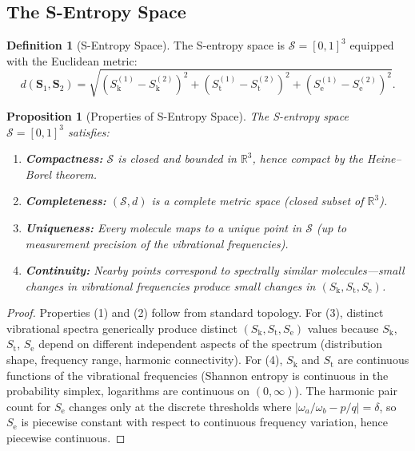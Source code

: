 \documentclass[11pt,a4paper]{article}
\newtheorem{proposition}[theorem]{Proposition}
\theoremstyle{definition}
\newtheorem{definition}[theorem]{Definition}
\theoremstyle{remark}
\newcommand{\Sk}{S_{\mathrm{k}}}
\newcommand{\St}{S_{\mathrm{t}}}
\newcommand{\Se}{S_{\mathrm{e}}}
\newcommand{\Sspace}{\mathcal{S}}
\newcommand{\Real}{\mathbb{R}}
\begin{document}
\subsection{The S-Entropy Space}

\begin{definition}[S-Entropy Space]
\label{def:s_space}
The S-entropy space is $\Sspace = [0,1]^3$ equipped with the Euclidean metric:
\begin{equation}
d(\mathbf{S}_1, \mathbf{S}_2) = \sqrt{(\Sk^{(1)} - \Sk^{(2)})^2 + (\St^{(1)} - \St^{(2)})^2 + (\Se^{(1)} - \Se^{(2)})^2}.
\label{eq:euclidean}
\end{equation}
\end{definition}

\begin{proposition}[Properties of S-Entropy Space]
\label{prop:s_space_properties}
The S-entropy space $\Sspace = [0,1]^3$ satisfies:
\begin{enumerate}[nosep]
\item \textbf{Compactness:} $\Sspace$ is closed and bounded in $\Real^3$, hence compact by the Heine--Borel theorem.
\item \textbf{Completeness:} $(\Sspace, d)$ is a complete metric space (closed subset of $\Real^3$).
\item \textbf{Uniqueness:} Every molecule maps to a unique point in $\Sspace$ (up to measurement precision of the vibrational frequencies).
\item \textbf{Continuity:} Nearby points correspond to spectrally similar molecules---small changes in vibrational frequencies produce small changes in $(\Sk, \St, \Se)$.
\end{enumerate}
\end{proposition}

\begin{proof}
Properties (1) and (2) follow from standard topology. For (3), distinct vibrational spectra generically produce distinct $(\Sk, \St, \Se)$ values because $\Sk$, $\St$, $\Se$ depend on different independent aspects of the spectrum (distribution shape, frequency range, harmonic connectivity). For (4), $\Sk$ and $\St$ are continuous functions of the vibrational frequencies (Shannon entropy is continuous in the probability simplex, logarithms are continuous on $(0, \infty)$). The harmonic pair count for $\Se$ changes only at the discrete thresholds where $|\omega_a/\omega_b - p/q| = \delta$, so $\Se$ is piecewise constant with respect to continuous frequency variation, hence piecewise continuous.
\end{proof}
\end{document}
